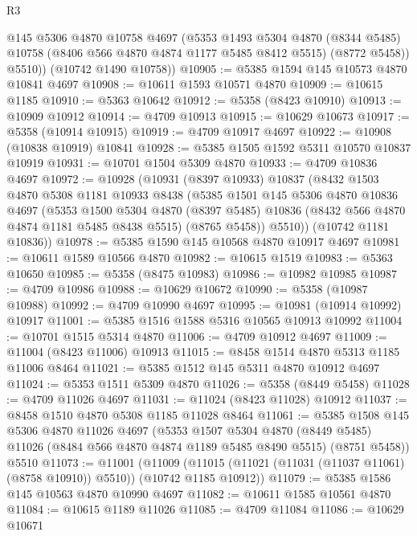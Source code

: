 \begin{lexlean}{R3}
\begin{coremodule}
          @145
          @5306
          @4870
          @10758
          @4697
          (@5353
            @1493
            @5304
            @4870
            (@8344 @5485)
            @10758
            (@8406 @566 @4870 @4874 @1177 @5485 @8412 @5515)
            (@8772 @5458))
          @5510))
      (@10742 @1490 @10758))
@10905 := @5385 @1594 @145 @10573 @4870 @10841 @4697
@10908 := @10611 @1593 @10571 @4870
@10909 := @10615 @1185
@10910 := @5363 @10642
@10912 := @5358 (@8423 @10910)
@10913 := @10909 @10912
@10914 := @4709 @10913
@10915 := @10629 @10673
@10917 := @5358 (@10914 @10915)
@10919 := @4709 @10917 @4697
@10922 := @10908 (@10838 @10919) @10841
@10928 := @5385 @1505 @1592 @5311 @10570 @10837 @10919
@10931 := @10701 @1504 @5309 @4870
@10933 := @4709 @10836 @4697
@10972 := @10928
    (@10931
      (@8397 @10933)
      @10837
      (@8432
        @1503
        @4870
        @5308
        @1181
        @10933
        @8438
        (@5385
          @1501
          @145
          @5306
          @4870
          @10836
          @4697
          (@5353
            @1500
            @5304
            @4870
            (@8397 @5485)
            @10836
            (@8432 @566 @4870 @4874 @1181 @5485 @8438 @5515)
            (@8765 @5458))
          @5510))
      (@10742 @1181 @10836))
@10978 := @5385 @1590 @145 @10568 @4870 @10917 @4697
@10981 := @10611 @1589 @10566 @4870
@10982 := @10615 @1519
@10983 := @5363 @10650
@10985 := @5358 (@8475 @10983)
@10986 := @10982 @10985
@10987 := @4709 @10986
@10988 := @10629 @10672
@10990 := @5358 (@10987 @10988)
@10992 := @4709 @10990 @4697
@10995 := @10981 (@10914 @10992) @10917
@11001 := @5385 @1516 @1588 @5316 @10565 @10913 @10992
@11004 := @10701 @1515 @5314 @4870
@11006 := @4709 @10912 @4697
@11009 := @11004 (@8423 @11006) @10913
@11015 := @8458 @1514 @4870 @5313 @1185 @11006 @8464
@11021 := @5385 @1512 @145 @5311 @4870 @10912 @4697
@11024 := @5353 @1511 @5309 @4870
@11026 := @5358 (@8449 @5458)
@11028 := @4709 @11026 @4697
@11031 := @11024 (@8423 @11028) @10912
@11037 := @8458 @1510 @4870 @5308 @1185 @11028 @8464
@11061 := @5385
    @1508
    @145
    @5306
    @4870
    @11026
    @4697
    (@5353
      @1507
      @5304
      @4870
      (@8449 @5485)
      @11026
      (@8484 @566 @4870 @4874 @1189 @5485 @8490 @5515)
      (@8751 @5458))
    @5510
@11073 := @11001
    (@11009 (@11015 (@11021 (@11031 (@11037 @11061) (@8758 @10910)) @5510)) (@10742 @1185 @10912))
@11079 := @5385 @1586 @145 @10563 @4870 @10990 @4697
@11082 := @10611 @1585 @10561 @4870
@11084 := @10615 @1189 @11026
@11085 := @4709 @11084
@11086 := @10629 @10671

\end{coremodule}
\end{lexlean}
